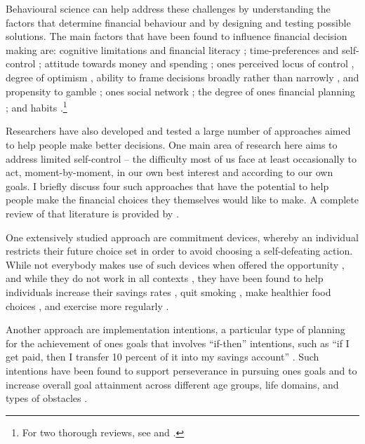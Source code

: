 Behavioural science can help address these challenges by understanding the
factors that determine financial behaviour and by designing and testing
possible solutions. The main factors that have been found to influence
financial decision making are: cognitive limitations and financial literacy
\citep{agarwal2009age, agarwal2013cognitive, korniotis2011older,
    agarwal2010learning, fernandes2014financial, jorring2020financial};
    time-preferences and self-control \citep{frederick2002time,
    read2018intertemporal, ericson2019intertemporal, cohen2020measuring};
    attitude towards money and spending \citep{rick2008tightwads,
    rick2011fatal}; ones perceived locus of control \citep{perry2005control},
    degree of optimism \citep{puri2007optimism}, ability to frame decisions
    broadly rather than narrowly \citep{kumar2008decision}, and propensity to
    gamble \citep{kumar2009gambles}; ones social network
    \citep{bailey2018economic, kuchler2021social}; the degree of ones financial
    planning \citep{ameriks2003wealth}; and habits
    \citep{blumenstock2018defaults, schaner2018persistent,
        de2013deposit}.\footnote{For two thorough reviews, see
    \citet{agarwal2017shapes} and \citet{greenberg2019financial}.}

Researchers have also developed and tested a large number of approaches aimed
to help people make better decisions. One main area of research here aims to
address limited self-control -- the difficulty most of us face at least
occasionally to act, moment-by-moment, in our own best interest and according
to our own goals. I briefly discuss four such approaches that have the
potential to help people make the financial choices they themselves would like
to make. A complete review of that literature is provided by
\citet{duckworth2018beyond}.

One extensively studied approach are commitment devices, whereby an individual
restricts their future choice set in order to avoid choosing a self-defeating
action. While not everybody makes use of such devices when offered the
opportunity \citep{bryan2010commitment}, and while they do not work in all
contexts \citep{laibson2015don,robinson2018some}, they have been found to help
individuals increase their savings rates \citep{ashraf2006tying}, quit smoking
\citep{gine2010put}, make healthier food choices \citep{schwartz2014healthier},
and exercise more regularly \citep{royer2015incentives}.

Another approach are implementation intentions, a particular type of planning
for the achievement of ones goals that involves ``if-then'' intentions, such as
``if I get paid, then I transfer 10 percent of it into my savings account''
\citep{gollwitzer2006implementation, rogers2015beyond}. Such intentions have
been found to support perseverance in pursuing ones goals
\citep{oettingen2010strategies} and to increase overall goal attainment across
different age groups, life domains, and types of obstacles
\citep{gollwitzer2006implementation}.

